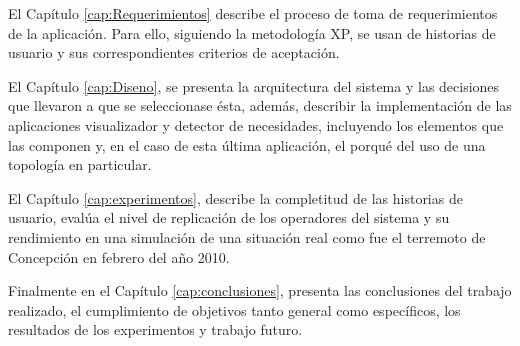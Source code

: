 El Capítulo \ref{cap:Requerimientos} describe el proceso de toma de requerimientos de la aplicación. Para ello, siguiendo la metodología XP, se usan de historias de usuario y sus correspondientes criterios de aceptación.

El Capítulo \ref{cap:Diseno}, se presenta la arquitectura del sistema y las decisiones que llevaron a que se seleccionase ésta, además, describir la implementación de las aplicaciones visualizador y detector de necesidades, incluyendo los elementos que las componen y, en el caso de esta última aplicación, el porqué del uso de una topología en particular.

El Capítulo \ref{cap:experimentos}, describe la completitud de las historias de usuario, evalúa el nivel de replicación de los operadores del sistema y su rendimiento en una simulación de una situación real como fue el terremoto de Concepción en febrero del año 2010.

Finalmente en el Capítulo \ref{cap:conclusiones}, presenta las conclusiones del trabajo realizado, el cumplimiento de objetivos tanto general como específicos, los resultados de los experimentos y trabajo futuro.